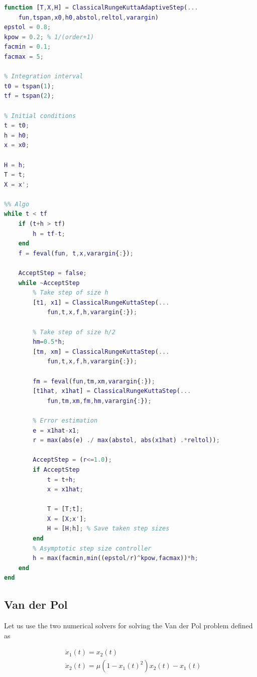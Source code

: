 \begin{adjustwidth*}{0cm}{-0.4cm}
\begin{lstlisting}[frame=single, language=Matlab,caption=Explicit Runge-Kutta with adaptive step size, label=ERKadapt]
function [T,X,H] = ClassicalRungeKuttaAdaptiveStep(...
    fun,tspan,x0,h0,abstol,reltol,varargin)
epstol = 0.8;
kpow = 0.2; % 1/(order+1)
facmin = 0.1;
facmax = 5;

% Integration interval
t0 = tspan(1);
tf = tspan(2);

% Initial conditions
t = t0;
h = h0;
x = x0;

H = h;
T = t;
X = x';

%% Algo
while t < tf
    if (t+h > tf)
        h = tf-t;
    end
    f = feval(fun, t,x,varargin{:});

    AcceptStep = false;
    while ~AcceptStep
        % Take step of size h
        [t1, x1] = ClassicalRungeKuttaStep(...
            fun,t,x,f,h,varargin{:});

        % Take step of size h/2
        hm=0.5*h;
        [tm, xm] = ClassicalRungeKuttaStep(...
            fun,t,x,f,h,varargin{:});
        
        fm = feval(fun,tm,xm,varargin{:});
        [t1hat, x1hat] = ClassicalRungeKuttaStep(...
            fun,tm,xm,fm,hm,varargin{:});

        % Error estimation
        e = x1hat-x1;
        r = max(abs(e) ./ max(abstol, abs(x1hat) .*reltol));

        AcceptStep = (r<=1.0);
        if AcceptStep
            t = t+h;
            x = x1hat;
              
            T = [T;t];
            X = [X;x'];
            H = [H;h]; % Save taken step sizes
        end
        % Asymptotic step size controller
        h = max(facmin,min((epstol/r)^kpow,facmax))*h;
    end
end
\end{lstlisting}
\end{adjustwidth*}

\subsection{Van der Pol}
Let us use the two numerical solvers for solving the Van der Pol problem defined as

\begin{equation}
\label{eq:vanderpol}
\begin{aligned}
&\dot{x}_{1}(t)=x_{2}(t) \\
&\dot{x}_{2}(t)=\mu\left(1-x_{1}(t)^{2}\right) x_{2}(t)-x_{1}(t)
\end{aligned}
\end{equation}


